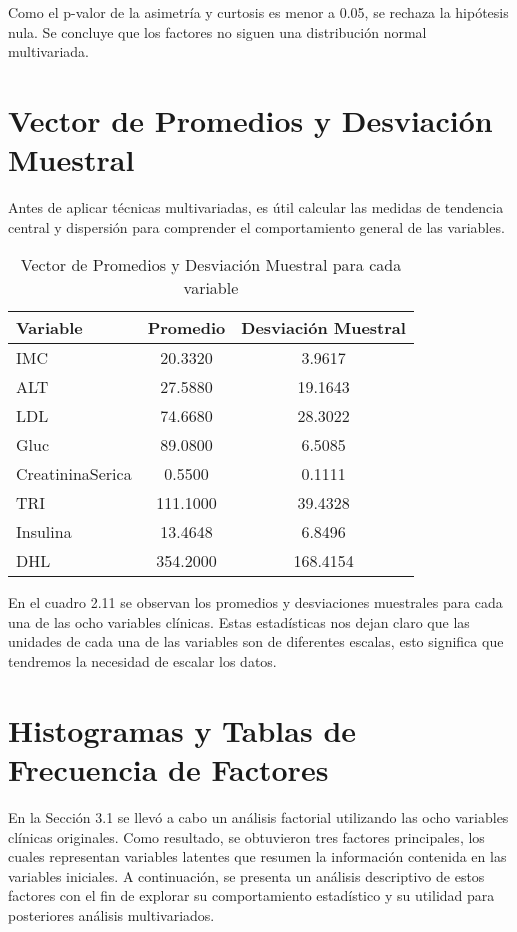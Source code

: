 \documentclass[12pt]{report}
\begin{document}
\noindent Como el p-valor de la asimetría y curtosis es menor a 0.05, se rechaza la hipótesis nula. Se concluye que los factores no siguen una distribución normal multivariada.

\newpage

\section{Vector de Promedios y Desviación Muestral}
Antes de aplicar técnicas multivariadas, es útil calcular las medidas de tendencia central y dispersión para comprender el comportamiento general de las variables.

\begin{table}[H]
\centering
\begin{tabular}{|l|c|c|}
\hline
\textbf{Variable} & \textbf{Promedio} & \textbf{Desviación Muestral} \\
\hline
IMC & 20.3320 & 3.9617 \\
ALT & 27.5880 & 19.1643 \\
LDL & 74.6680 & 28.3022 \\
Gluc & 89.0800 & 6.5085 \\
CreatininaSerica & 0.5500 & 0.1111 \\
TRI & 111.1000 & 39.4328 \\
Insulina & 13.4648 & 6.8496 \\
DHL & 354.2000 & 168.4154 \\
\hline
\end{tabular}
\caption{Vector de Promedios y Desviación Muestral para cada variable}
\end{table}

\noindent En el cuadro 2.11 se observan los promedios y desviaciones muestrales para cada una de las ocho variables clínicas. Estas estadísticas nos dejan claro que las unidades de cada una de las variables son de diferentes escalas, esto significa que tendremos la necesidad de escalar los datos.
\newpage
\section{Histogramas y Tablas de Frecuencia de Factores}
En la Sección 3.1 se llevó a cabo un análisis factorial utilizando las ocho variables clínicas originales. Como resultado, se obtuvieron tres factores principales, los cuales representan variables latentes que resumen la información contenida en las variables iniciales. A continuación, se presenta un análisis descriptivo de estos factores con el fin de explorar su comportamiento estadístico y su utilidad para posteriores análisis multivariados.
\end{document}
